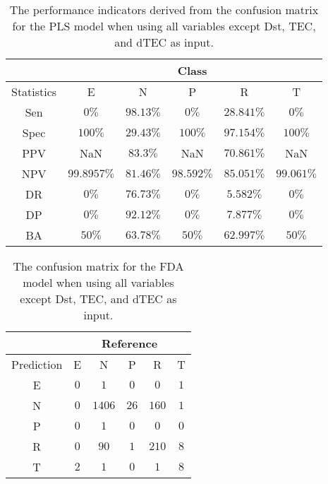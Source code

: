 \begin{table}[!ht]
	\centering
	\begin{tabular}{|c|c|c|c|c|c|}
		\hline
		 & \multicolumn{5}{c|}{Class} \\ \hline
		Statistics & E & N & P & R & T \\ \hline
		Sen & $0\%$ & $98.13\%$ & $0\%$ & $28.841\%$ & $0\%$ \\ \hline
		Spec & $100\%$ & $29.43\%$ & $100\%$ & $97.154\%$ & $100\%$ \\ \hline
		PPV & NaN & $83.3\%$ & NaN & $70.861\%$ & NaN \\ \hline
		NPV & $99.8957\%$ & $81.46\%$ & $98.592\%$ & $85.051\%$ & $99.061\%$ \\ \hline
		DR & $0\%$ & $76.73\%$ & $0\%$ & $5.582\%$ & $0\%$ \\ \hline
		DP & $0\%$ & $92.12\%$ & $0\%$ & $7.877\%$ & $0\%$ \\ \hline
		BA & $50\%$ & $63.78\%$ & $50\%$ & $62.997\%$ & $50\%$ \\ \hline
	\end{tabular}
	\caption{The performance indicators derived from the confusion matrix for the PLS model when using all variables except Dst, TEC, and dTEC as input.}
	\label{tab:cs:reverse:noTEC:pls}
\end{table}

\begin{table}[!ht]
	\centering
	\begin{tabular}{|c|c|c|c|c|c|}
		\hline
		 & \multicolumn{5}{|c|}{Reference} \\ \hline
		 Prediction & E & N & P & R & T \\ \hline
		 E & $0$ & $1$ & $0$ & $0$ & $1$ \\ \hline
		 N & $0$ & $1406$ & $26$ & $160$ & $1$ \\ \hline
		 P & $0$ & $1$ & $0$ & $0$ & $0$ \\ \hline
		 R & $0$ & $90$ & $1$ & $210$ & $8$ \\ \hline
		 T & $2$ & $1$ & $0$ & $1$ & $8$ \\ \hline
	\end{tabular}
	\caption{The confusion matrix for the FDA model when using all variables except Dst, TEC, and dTEC as input.}
	\label{tab:cm:noTEC:fda}
\end{table}

